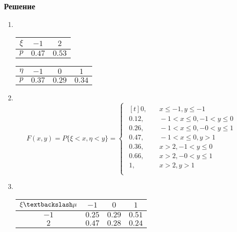 \documentclass[12pt]{article}
\begin{document}
\subsubsection*{Решение}
\begin{enumerate}
	\item \mbox{}\\
	      \begin{tabular}{|c|c|c|}
		      \hline
		      $\xi $ & $-1$   & $2$    \\
		      \hline
		      $p$    & $0.47$ & $0.53$ \\
		      \hline
	      \end{tabular}
	      \begin{tabular}{|c|c|c|c|}
		      \hline
		      $\eta $ & $-1$   & $0$    & $1$    \\
		      \hline
		      $p$     & $0.37$ & $0.29$ & $0.34$ \\
		      \hline
	      \end{tabular}

	\item \mbox{}\\
	      \begin{equation*}
		      F(x, y) = P\{\xi < x, \eta < y\} =
		      \begin{cases}
			      \begin{aligned}[t]
				      0,    & \quad x \leq -1, y \leq -1         \\
				      0.12, & \quad -1 < x \leq 0, -1 < y \leq 0 \\
				      0.26, & \quad -1 < x \leq 0, -0 < y \leq 1 \\
				      0.47, & \quad -1 < x \leq 0, y > 1         \\
				      0.36, & \quad x > 2, -1 < y \leq 0         \\
				      0.66, & \quad x > 2, -0 < y \leq 1         \\
				      1,    & \quad x > 2, y > 1                 \\
			      \end{aligned}
		      \end{cases}
	      \end{equation*}

	\item \mbox{}\\
	      \begin{tabular}{|c|c|c|c|}
		      \hline
		      $\xi \textbackslash \mu$ & $-1$   & $0$    & $1$    \\
		      \hline
		      $-1$                     & $0.25$ & $0.29$ & $0.51$ \\
		      \hline
		      $2$                      & $0.47$ & $0.28$ & $0.24$ \\
		      \hline
	      \end{tabular} \\


\end{enumerate}
\end{document}
